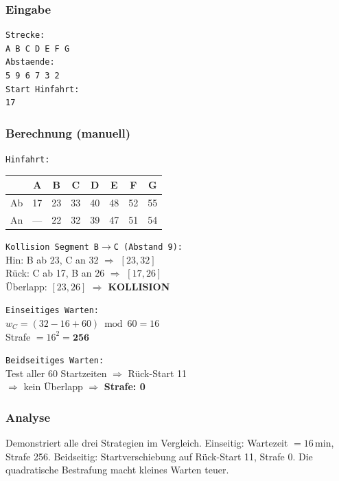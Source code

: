 \documentclass[12pt,a4paper]{article}
\begin{document}
\noindent
\begin{minipage}[t]{0.48\textwidth}
\scriptsize
\setlength{\tabcolsep}{2pt}

\subsubsection*{Eingabe}
\begin{lstlisting}
Strecke:
A B C D E F G
Abstaende:
5 9 6 7 3 2
Start Hinfahrt:
17
\end{lstlisting}

\subsubsection*{Berechnung (manuell)}
\texttt{Hinfahrt:}\\[2pt]
\begin{tabular}{l|ccccccc}
\toprule
 & A & B & C & D & E & F & G\\
\midrule
Ab & 17 & 23 & 33 & 40 & 48 & 52 & 55\\
An & — & 22 & 32 & 39 & 47 & 51 & 54\\
\bottomrule
\end{tabular}

\vspace{4pt}
\texttt{Kollision Segment B$\to$C (Abstand 9):}\\
Hin: B ab 23, C an 32 $\Rightarrow$ $[23,32]$\\
Rück: C ab 17, B an 26 $\Rightarrow$ $[17,26]$\\
Überlapp: $[23,26]$ $\Rightarrow$ \textbf{KOLLISION}

\vspace{4pt}
\texttt{Einseitiges Warten:}\\
$w_C = (32 - 16 + 60)\bmod 60 = 16$\\
Strafe $= 16^2 = \mathbf{256}$

\vspace{4pt}
\texttt{Beidseitiges Warten:}\\
Test aller 60 Startzeiten $\Rightarrow$ Rück-Start 11\\
$\Rightarrow$ kein Überlapp $\Rightarrow$ \textbf{Strafe: 0}

\subsubsection*{Analyse}
Demonstriert alle drei Strategien im Vergleich.
Einseitig: Wartezeit $= 16$\,min, Strafe 256.
Beidseitig: Startverschiebung auf Rück-Start 11, Strafe 0.
Die quadratische Bestrafung macht kleines Warten teuer.
\end{minipage}
\end{document}
